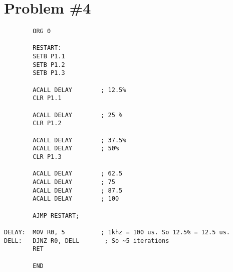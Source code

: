 \documentclass[12pt]{article}
\begin{document}
\section{Problem \#4}
\begin{verbatim}
        ORG 0

        RESTART:
        SETB P1.1
        SETB P1.2
        SETB P1.3

        ACALL DELAY        ; 12.5%
        CLR P1.1

        ACALL DELAY        ; 25 %
        CLR P1.2

        ACALL DELAY        ; 37.5%
        ACALL DELAY        ; 50%
        CLR P1.3

        ACALL DELAY        ; 62.5
        ACALL DELAY        ; 75
        ACALL DELAY        ; 87.5
        ACALL DELAY        ; 100

        AJMP RESTART;

DELAY:  MOV R0, 5          ; 1khz = 100 us. So 12.5% = 12.5 us.
DELL:   DJNZ R0, DELL       ; So ~5 iterations
        RET

        END
\end{verbatim}
\end{document}
